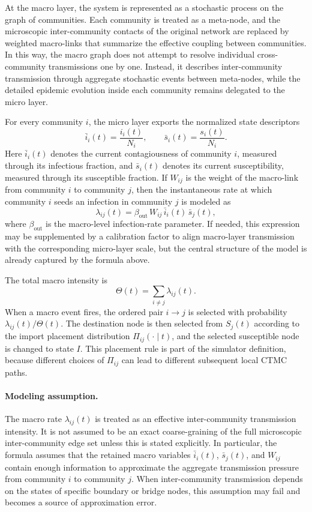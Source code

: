 \documentclass[a4paper,fleqn]{cas-sc}
\begin{document}
At the macro layer, the system is represented as a stochastic process on the graph of communities. Each community is treated as a meta-node, and the microscopic inter-community contacts of the original network are replaced by weighted macro-links that summarize the effective coupling between communities. In this way, the macro graph does not attempt to resolve individual cross-community transmissions one by one. Instead, it describes inter-community transmission through aggregate stochastic events between meta-nodes, while the detailed epidemic evolution inside each community remains delegated to the micro layer.

For every community \(i\), the micro layer exports the normalized state descriptors
\[
\bar{i}_i(t)=\frac{i_i(t)}{N_i},
\qquad
\bar{s}_i(t)=\frac{s_i(t)}{N_i}.
\]
Here \(\bar{i}_i(t)\) denotes the current contagiousness of community \(i\), measured through its infectious fraction, and \(\bar{s}_i(t)\) denotes its current susceptibility, measured through its susceptible fraction. If \(W_{ij}\) is the weight of the macro-link from community \(i\) to community \(j\), then the instantaneous rate at which community \(i\) seeds an infection in community \(j\) is modeled as
\[
\lambda_{ij}(t)
=\beta_{\mathrm{out}}\,W_{ij}\,\bar{i}_i(t)\,\bar{s}_j(t),
\]
where \(\beta_{\mathrm{out}}\) is the macro-level infection-rate parameter. If needed, this expression may be supplemented by a calibration factor to align macro-layer transmission with the corresponding micro-layer scale, but the central structure of the model is already captured by the formula above. 

The total macro intensity is
\[
\Theta(t)=\sum_{i\neq j}\lambda_{ij}(t).
\]
When a macro event fires, the ordered pair \(i\to j\) is selected with probability \(\lambda_{ij}(t)/\Theta(t)\). The destination node is then selected from \(S_j(t)\) according to the import placement distribution \(\Pi_{ij}(\cdot\mid t)\), and the selected susceptible node is changed to state \(I\). This placement rule is part of the simulator definition, because different choices of \(\Pi_{ij}\) can lead to different subsequent local CTMC paths.

\paragraph{Modeling assumption.}
The macro rate \(\lambda_{ij}(t)\) is treated as an effective inter-community transmission intensity. 
It is not assumed to be an exact coarse-graining of the full microscopic inter-community edge set unless this is stated explicitly. 
In particular, the formula assumes that the retained macro variables \(\bar{i}_i(t)\), \(\bar{s}_j(t)\), and \(W_{ij}\) contain enough information to approximate the aggregate transmission pressure from community \(i\) to community \(j\). 
When inter-community transmission depends on the states of specific boundary or bridge nodes, this assumption may fail and becomes a source of approximation error.
\end{document}
